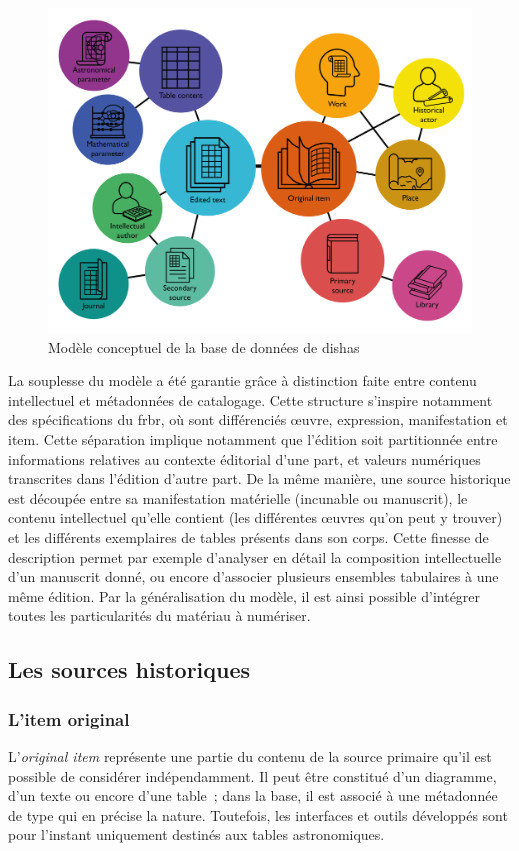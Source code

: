 \documentclass[a4paper,12pt,twoside]{book}
\newcommand{\eng}{\emph}
\newcommand{\oi}{\eng{original item}\xspace}
\newcommand{\dishas}{\gls{dishas}\xspace}
\newcommand{\frbr}{\gls{frbr}\xspace}
\begin{document}
\begin{figure}[h!]
	\centering
	\includegraphics[width=12cm]{Images/Modele-de-donnees.png}
	\caption{\label{Modelisation}Modèle conceptuel de la base de données de \dishas}
\end{figure}

La souplesse du modèle a été garantie grâce à distinction faite entre contenu intellectuel et métadonnées de catalogage. Cette structure s'inspire notamment des spécifications du \frbr, où sont différenciés œuvre, expression, manifestation et item. Cette séparation implique notamment que l'édition soit partitionnée entre informations relatives au contexte éditorial d'une part, et valeurs numériques transcrites dans l'édition d'autre part. De la même manière, une source historique est découpée entre sa manifestation matérielle (incunable ou manuscrit), le contenu intellectuel qu'elle contient (les différentes œuvres qu'on peut y trouver) et les différents exemplaires de tables présents dans son corps. Cette finesse de description permet par exemple d'analyser en détail la composition intellectuelle d'un manuscrit donné, ou encore d'associer plusieurs ensembles tabulaires à une même édition. Par la généralisation du modèle, il est ainsi possible d'intégrer toutes les particularités du matériau à numériser.

		\subsection{Les sources historiques}
			\subsubsection{L'item original}
L'\oi représente une partie du contenu de la source primaire qu'il est possible de considérer indépendamment. Il peut être constitué d'un diagramme, d'un texte ou encore d'une table~; dans la base, il est associé à une métadonnée de type qui en précise la nature. Toutefois, les interfaces et outils développés sont pour l'instant uniquement destinés aux tables astronomiques.
\end{document}
